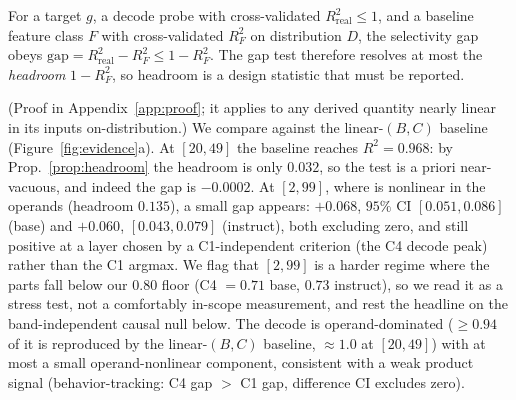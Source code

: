 \begin{proposition}
\label{prop:headroom}
For a target $g$, a decode probe with cross-validated $R^2_{\mathrm{real}}\le 1$, and a baseline
feature class $F$ with cross-validated $R^2_{F}$ on distribution $D$, the selectivity gap obeys
$\mathrm{gap}=R^2_{\mathrm{real}}-R^2_{F}\le 1-R^2_{F}$. The gap test therefore resolves at most the
\emph{headroom} $1-R^2_{F}$, so headroom is a design statistic that must be reported.
\end{proposition}

\noindent (Proof in Appendix~\ref{app:proof}; it applies to any derived quantity nearly linear in
its inputs on-distribution.) We compare \bc{} against the linear-$(B,C)$ baseline
(Figure~\ref{fig:evidence}a). At $[20,49]$ the baseline reaches $R^2 = 0.968$: by
Prop.~\ref{prop:headroom} the headroom is only $0.032$, so the test is a priori near-vacuous, and
indeed the gap is $-0.0002$. At $[2,99]$, where \bc{} is nonlinear in the operands (headroom
$0.135$), a small gap appears: $+0.068$, $95\%$ CI $[0.051, 0.086]$
(base) and $+0.060$, $[0.043, 0.079]$ (instruct), both excluding zero, and still positive at a
layer chosen by a C1-independent criterion (the C4 decode peak) rather than the C1 argmax. We flag that $[2,99]$ is
a harder regime where the parts fall below our $0.80$ floor (C4 $= 0.71$ base,
$0.73$ instruct), so we read it as a stress test, not a comfortably
in-scope measurement, and rest the headline on the band-independent causal null below. The
decode is operand-dominated ($\geq 0.94$ of it is reproduced by the linear-$(B,C)$ baseline,
$\approx 1.0$ at $[20,49]$) with at most a small operand-nonlinear component, consistent with a
weak product signal (behavior-tracking: C4 gap $>$ C1 gap, difference CI excludes zero).

